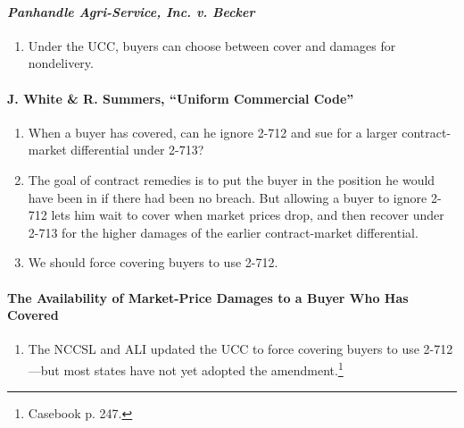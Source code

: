 \paragraph{\emph{Panhandle Agri-Service, Inc. v. Becker}}

\begin{enumerate}
    \item Under the UCC, buyers can choose between cover and damages for 
    nondelivery.
\end{enumerate}

\paragraph{J. White \& R. Summers, ``Uniform Commercial Code''}

\begin{enumerate}
    \item When a buyer has covered, can he ignore 2-712 and sue for a larger 
    contract-market differential under 2-713?
    \item The goal of contract remedies is to put the buyer in the position he 
    would have been in if there had been no breach. But allowing a buyer to 
    ignore 2-712 lets him wait to cover when market prices drop, and then 
    recover under 2-713 for the higher damages of the earlier contract-market 
    differential.
    \item We should force covering buyers to use 2-712.
\end{enumerate}

\paragraph{The Availability of Market-Price Damages to a Buyer Who Has Covered}

\begin{enumerate}
    \item The NCCSL and ALI updated the UCC to force covering buyers to use 
    2-712---but most states have not yet adopted the 
    amendment.\footnote{Casebook p. 247.}
\end{enumerate}


